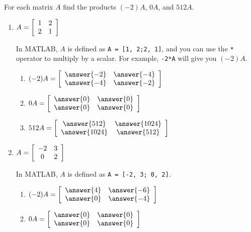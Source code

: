 \documentclass{ximera}
\author{Zack Reed}
\begin{document}
\begin{exercise}
  For each matrix $A$ find the products $(-2)A$, $0A$, and $512A$.
  \begin{enumerate}
    \item
    $A = \startmat{cc}
      1 & 2 \\
      2 & 1
    \stopmat$

    \begin{hint}
    
      In MATLAB, $A$ is defined as \texttt{A = [1, 2;2, 1]}, and you can use the \texttt{*} operator to multiply by a scalar. For example, \texttt{-2*A} will give you $(-2)A$.


    \end{hint}

    \begin{enumerate}
      \item $(-2)A = 
      \startmat{cc}
      \answer{-2} & \answer{-4} \\
      \answer{-4} & \answer{-2}
      \stopmat$

      \item $0A =
      \startmat{cc}
      \answer{0} & \answer{0} \\
      \answer{0} & \answer{0}
      \stopmat$

      \item $512A =
      \startmat{cc}
      \answer{512} & \answer{1024} \\
      \answer{1024} & \answer{512}
      \stopmat$
    \end{enumerate}
  \item
    $A = \startmat{cc}
      -2 & 3 \\
      0 & 2
    \stopmat$

    \begin{hint}
      
        In MATLAB, $A$ is defined as \texttt{A = [-2, 3; 0, 2]}.

    \end{hint}

    \begin{enumerate}
      \item $(-2)A = 
      \startmat{cc}
      \answer{4} & \answer{-6} \\
      \answer{0} & \answer{-4}
      \stopmat$

      \item $0A =
      \startmat{cc}
      \answer{0} & \answer{0} \\
      \answer{0} & \answer{0}
      \stopmat$


\end{enumerate}
\end{enumerate}
\end{exercise}
\end{document}
